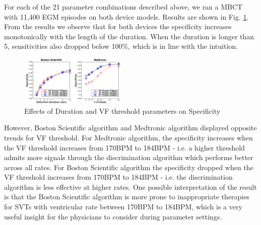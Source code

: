 For each of the 21 parameter combinations described above, we ran a MBCT with 11,400 EGM episodes on both device models. 
Results are shown in Fig. \ref{fig:parameter}.
From the results we observe that for both devices the specificity increases monotonically with the length of the duration.
When the duration is longer than 5, sensitivities also dropped below 100\%, which is in line with the intuition.

\begin{figure}[t]
		\centering
		\vspace{-10pt}
		\includegraphics[width=0.45\textwidth]{figures/parameter.pdf}
		\caption{\small Effects of Duration and VF threshold parameters on Specificity}
		\vspace{-10pt}
		\label{fig:parameter}
\end{figure}

However, Boston Scientific algorithm and Medtronic algorithm displayed opposite trends for VF threshold.
For Medtronic algorithm, the specificity increases when the VF threshold increases from 170BPM to 184BPM - i.e. a higher threshold admits more signals through the discrimination algorithm which performs better across all rates.
For Boston Scientific algorithm the specificity dropped when the VF threshold increases from 170BPM to 184BPM - i.e. the discrimination algorithm is less effective at higher rates. 
One possible interpretation of the result is that the Boston Scientific algorithm is more prone to inappropriate therapies for SVTs with ventricular rate between 170BPM to 184BPM, which is a very useful insight for the physicians to consider during parameter settings. 








